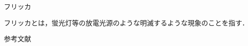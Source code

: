 \documentclass[8pt, jfont=ipaexm, t]{beamer} %
\begin{document}
\begin{frame}{フリッカ}
  \begin{block}{}
    フリッカとは，蛍光灯等の放電光源のような明滅するような現象のことを指す．
  \end{block}
\end{frame}




\begin{frame}[allowframebreaks]{参考文献}
  \beamertemplatetextbibitems
	
  \nocite{*}
	
\end{frame}
\end{document}
